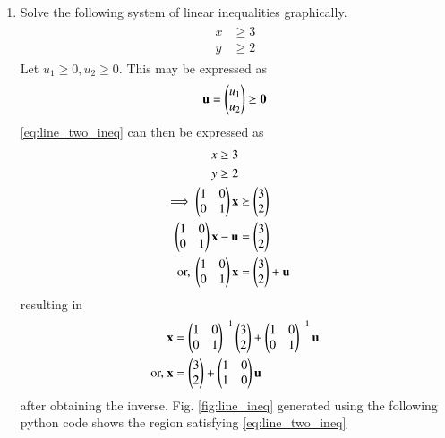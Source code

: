 \renewcommand{\theequation}{\theenumi}
\begin{enumerate}[label=\arabic*.,ref=\thesubsubsection.\theenumi]
\item Solve the following system of linear inequalities graphically.
\begin{align}
\label{eq:line_two_ineq}
\begin{split}
    x &\geq 3
\\
    y &\geq 2
\end{split}
\end{align}
Let $u_1 \ge 0, u_2 \ge 0$.  This may be expressed as
\begin{align}
\mathbf{u} = \begin{pmatrix}u_1\\u_2\end{pmatrix}\succeq \mathbf{0}
\end{align}
%
\eqref{eq:line_two_ineq} can then be expressed as
\begin{align}
\begin{split}
    x &\geq 3
\\
    y &\geq 2
\end{split}
%
\\
\implies 
\myvec{1 & 0 \\ 0 & 1}\vec{x}  &\succeq \myvec{3\\2}
\\
\myvec{1 & 0 \\ 0 & 1}\vec{x}  -\vec{u}&=\myvec{3\\2}
\\
\text{or, }
\myvec{1 & 0 \\ 0 & 1}\vec{x} &= \myvec{3\\2} +\vec{u}
\end{align}
%
resulting in 
\begin{align}
\mathbf{x} &= \begin{pmatrix}1 & 0 \\ 0 & 1\end{pmatrix}^{-1}\begin{pmatrix}3\\2\end{pmatrix} +\begin{pmatrix}1 & 0 \\ 0 & 1\end{pmatrix}^{-1}\mathbf{u}
\\
\text{or, } \mathbf{x} &= \begin{pmatrix}3\\2\end{pmatrix} +\begin{pmatrix}1 & 0 \\ 1 & 0\end{pmatrix}\mathbf{u}
\end{align}
%
after obtaining the  inverse.
%
 Fig. \ref{fig:line_ineq} generated using the following python code shows the region satisfying \eqref{eq:line_two_ineq}


\end{enumerate}
